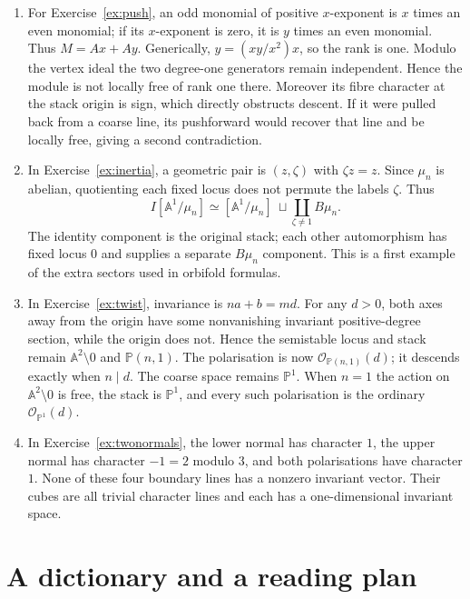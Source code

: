 \documentclass[11pt,a4paper]{article}
\numberwithin{equation}{section}
\theoremstyle{definition}
\newcommand{\A}{\mathbb A}
\newcommand{\PP}{\mathbb P}
\newcommand{\OO}{\mathcal O}
\begin{document}
\begin{enumerate}[label=\textbf{\arabic*.},leftmargin=*]
\item For Exercise~\ref{ex:push}, an odd monomial of positive $x$-exponent
is $x$ times an even monomial; if its $x$-exponent is zero, it is $y$
times an even monomial. Thus $M=Ax+Ay$. Generically,
$y=(xy/x^2)x$, so the rank is one. Modulo the vertex ideal the two
degree-one generators remain independent. Hence the module is not
locally free of rank one there. Moreover its fibre character at the
stack origin is sign, which directly obstructs descent. If it were
pulled back from a coarse line, its pushforward would recover that line
and be locally free, giving a second contradiction.

\item In Exercise~\ref{ex:inertia}, a geometric pair is $(z,\zeta)$ with
$\zeta z=z$. Since $\mu_n$ is abelian, quotienting each fixed locus
does not permute the labels $\zeta$. Thus
\[
 I[\A^1/\mu_n]
 \simeq[\A^1/\mu_n]\ \sqcup\!
 \coprod_{\zeta\ne1}B\mu_n.
\]
The identity component is the original stack; each other automorphism
has fixed locus $0$ and supplies a separate $B\mu_n$ component. This
is a first example of the extra sectors used in orbifold formulas.

\item In Exercise~\ref{ex:twist}, invariance is $na+b=md$. For any
$d>0$, both axes away from the origin have some nonvanishing invariant
positive-degree section, while the origin does not. Hence the
semistable locus and stack remain $\A^2\setminus0$ and $\PP(n,1)$.
The polarisation is now $\OO_{\PP(n,1)}(d)$; it descends exactly when
$n\mid d$. The coarse space remains $\PP^1$. When $n=1$ the action
on $\A^2\setminus0$ is free, the stack is $\PP^1$, and every such
polarisation is the ordinary $\OO_{\PP^1}(d)$.

\item In Exercise~\ref{ex:twonormals}, the lower normal has character
$1$, the upper normal has character $-1=2$ modulo $3$, and both
polarisations have character $1$. None of these four boundary lines
has a nonzero invariant vector. Their cubes are all trivial character
lines and each has a one-dimensional invariant space.
\end{enumerate}

\section{A dictionary and a reading plan}
\label{sec:dictionary}
\end{document}
